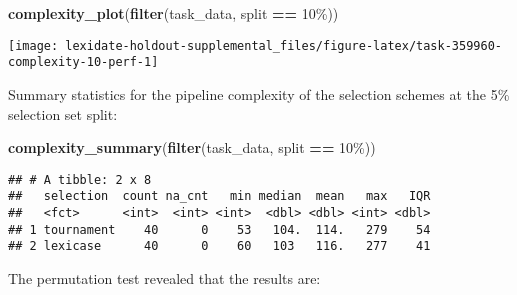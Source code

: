 \documentclass[
]{book}
\newenvironment{Shaded}{\begin{snugshade}}{\end{snugshade}}
\newcommand{\AttributeTok}[1]{\textcolor[rgb]{0.13,0.29,0.53}{#1}}
\newcommand{\DecValTok}[1]{\textcolor[rgb]{0.00,0.00,0.81}{#1}}
\newcommand{\FunctionTok}[1]{\textcolor[rgb]{0.13,0.29,0.53}{\textbf{#1}}}
\newcommand{\NormalTok}[1]{#1}
\newcommand{\OtherTok}[1]{\textcolor[rgb]{0.56,0.35,0.01}{#1}}
\newcommand{\SpecialCharTok}[1]{\textcolor[rgb]{0.81,0.36,0.00}{\textbf{#1}}}
\newcommand{\StringTok}[1]{\textcolor[rgb]{0.31,0.60,0.02}{#1}}
\begin{document}
\begin{Shaded}
\begin{Highlighting}[]
\FunctionTok{complexity\_plot}\NormalTok{(}\FunctionTok{filter}\NormalTok{(task\_data, split }\SpecialCharTok{==} \StringTok{\textquotesingle{}10\%\textquotesingle{}}\NormalTok{))}
\end{Highlighting}
\end{Shaded}

\texttt{[image: lexidate-holdout-supplemental\_files/figure-latex/task-359960-complexity-10-perf-1]}

Summary statistics for the pipeline complexity of the selection schemes at the 5\% selection set split:

\begin{Shaded}
\begin{Highlighting}[]
\FunctionTok{complexity\_summary}\NormalTok{(}\FunctionTok{filter}\NormalTok{(task\_data, split }\SpecialCharTok{==} \StringTok{\textquotesingle{}10\%\textquotesingle{}}\NormalTok{))}
\end{Highlighting}
\end{Shaded}

\begin{verbatim}
## # A tibble: 2 x 8
##   selection  count na_cnt   min median  mean   max   IQR
##   <fct>      <int>  <int> <int>  <dbl> <dbl> <int> <dbl>
## 1 tournament    40      0    53   104.  114.   279    54
## 2 lexicase      40      0    60   103   116.   277    41
\end{verbatim}

The permutation test revealed that the results are:

\begin{Shaded}
\end{Shaded}
\end{document}
